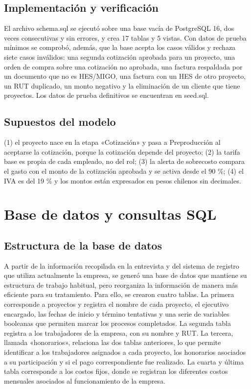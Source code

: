 \documentclass[11pt,letterpaper]{article}
\begin{document}
\subsection{Implementación y verificación}

El archivo schema.sql se ejecutó sobre una base vacía de PostgreSQL 16, dos veces consecutivas y sin errores, y crea 17 tablas y 5 vistas. Con datos de prueba mínimos se comprobó, además, que la base acepta los casos válidos y rechaza siete casos inválidos: una segunda cotización aprobada para un proyecto, una orden de compra sobre una cotización no aprobada, una factura respaldada por un documento que no es HES/MIGO, una factura con un HES de otro proyecto, un RUT duplicado, un monto negativo y la eliminación de un cliente que tiene proyectos. Los datos de prueba definitivos se encuentran en seed.sql.


\subsection{Supuestos del modelo}

(1) el proyecto nace en la etapa «Cotización» y pasa a Preproducción al aceptarse la cotización, porque la cotización depende del proyecto; (2) la tarifa base es propia de cada empleado, no del rol; (3) la alerta de sobrecosto compara el gasto con el monto de la cotización aprobada y se activa desde el 90 \%; (4) el IVA es del 19 \% y los montos están expresados en pesos chilenos sin decimales.


\section{Base de datos y consultas SQL}

\subsection{Estructura de la base de datos}

A partir de la información recopilada en la entrevista y del sistema de registro que utiliza actualmente la empresa, se generó una base de datos que mantiene su estructura de trabajo habitual, pero reorganiza la información de manera más eficiente para su tratamiento. Para ello, se crearon cuatro tablas. La primera corresponde a proyectos y registra el nombre de cada proyecto, el ejecutivo encargado, las fechas de inicio y término tentativas y una serie de variables booleanas que permiten marcar los procesos completados. La segunda tabla registra a los trabajadores de la empresa, con su nombre y RUT. La tercera, llamada «honorarios», relaciona las dos tablas anteriores, lo que permite identificar a los trabajadores asignados a cada proyecto, los honorarios asociados a su participación y si el pago correspondiente fue realizado. La cuarta y última tabla corresponde a los costos fijos, donde se registran los diferentes costos mensuales asociados al funcionamiento de la empresa.
\end{document}
